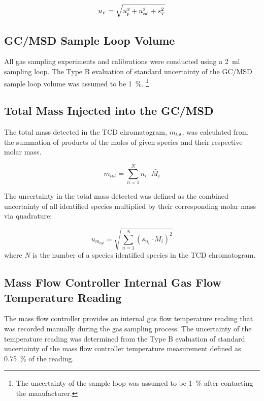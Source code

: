 \documentclass[12pt]{article}
\begin{document}
\begin{equation}
\label{eq:volumetric_flow_uncertainty}
u_{\scriptscriptstyle \dot{V}} = \sqrt{u_{\rm \scriptscriptstyle p}^2 + u_{\rm \scriptscriptstyle cal}^2 + s_{\scriptscriptstyle \dot{V}}^2}
\end{equation}

\subsection{GC/MSD Sample Loop Volume}
\label{ssec:Sample_Loop_Volume}

All gas sampling experiments and calibrations were conducted using a 2~\si{ml} sampling loop. The Type B evaluation of standard uncertainty of the GC/MSD sample loop volume was assumed to be 1~\%. \footnote{The uncertainty of the sample loop was assumed to be 1~\% after contacting the manufacturer.}

\subsection{Total Mass Injected into the GC/MSD}
\label{ssec:Total_Mass_Injected_into_GC/MSD}
The total mass detected in the TCD chromatogram, $m_{tot}$, was calculated from the summation of products of the moles of given species and their respective molar mass. 

\begin{equation}
\label{eq:total_mass_detected_uncertainty}
m_{tot}=\sum_{n=1}^{N}  n_{i}\cdot\bar{M_{i}}
\end{equation}

The uncertainty in the total mass detected was defined as the combined uncertainty of all identified species multiplied by their corresponding molar mass via quadrature:

\begin{equation}
\label{eq:total_mass_detected_uncertainty}
u_{\scriptscriptstyle m_{tot}}=\sqrt{{\sum_{n=1}^{N} (s_{\scriptscriptstyle n_{i}}\cdot\bar{M_{i}})^2}}
\end{equation}
where $N$ is the number of a species identified species in the TCD chromatogram. 

\subsection{Mass Flow Controller Internal Gas Flow Temperature Reading}
\label{ssec:MFC_Temp}

The mass flow controller provides an internal gas flow temperature reading that was recorded manually during the gas sampling process. The uncertainty of the temperature reading was determined from the Type B evaluation of standard uncertainty of the mass flow controller temperature measurement defined as 0.75~\% of the reading.
\end{document}
